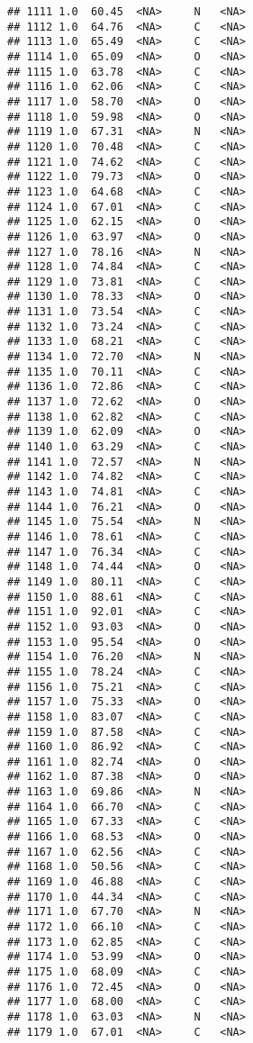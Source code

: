 \documentclass[
]{article}
\begin{document}
\begin{verbatim}
## 1111 1.0  60.45  <NA>     N   <NA>
## 1112 1.0  64.76  <NA>     C   <NA>
## 1113 1.0  65.49  <NA>     C   <NA>
## 1114 1.0  65.09  <NA>     O   <NA>
## 1115 1.0  63.78  <NA>     C   <NA>
## 1116 1.0  62.06  <NA>     C   <NA>
## 1117 1.0  58.70  <NA>     O   <NA>
## 1118 1.0  59.98  <NA>     O   <NA>
## 1119 1.0  67.31  <NA>     N   <NA>
## 1120 1.0  70.48  <NA>     C   <NA>
## 1121 1.0  74.62  <NA>     C   <NA>
## 1122 1.0  79.73  <NA>     O   <NA>
## 1123 1.0  64.68  <NA>     C   <NA>
## 1124 1.0  67.01  <NA>     C   <NA>
## 1125 1.0  62.15  <NA>     O   <NA>
## 1126 1.0  63.97  <NA>     O   <NA>
## 1127 1.0  78.16  <NA>     N   <NA>
## 1128 1.0  74.84  <NA>     C   <NA>
## 1129 1.0  73.81  <NA>     C   <NA>
## 1130 1.0  78.33  <NA>     O   <NA>
## 1131 1.0  73.54  <NA>     C   <NA>
## 1132 1.0  73.24  <NA>     C   <NA>
## 1133 1.0  68.21  <NA>     C   <NA>
## 1134 1.0  72.70  <NA>     N   <NA>
## 1135 1.0  70.11  <NA>     C   <NA>
## 1136 1.0  72.86  <NA>     C   <NA>
## 1137 1.0  72.62  <NA>     O   <NA>
## 1138 1.0  62.82  <NA>     C   <NA>
## 1139 1.0  62.09  <NA>     O   <NA>
## 1140 1.0  63.29  <NA>     C   <NA>
## 1141 1.0  72.57  <NA>     N   <NA>
## 1142 1.0  74.82  <NA>     C   <NA>
## 1143 1.0  74.81  <NA>     C   <NA>
## 1144 1.0  76.21  <NA>     O   <NA>
## 1145 1.0  75.54  <NA>     N   <NA>
## 1146 1.0  78.61  <NA>     C   <NA>
## 1147 1.0  76.34  <NA>     C   <NA>
## 1148 1.0  74.44  <NA>     O   <NA>
## 1149 1.0  80.11  <NA>     C   <NA>
## 1150 1.0  88.61  <NA>     C   <NA>
## 1151 1.0  92.01  <NA>     C   <NA>
## 1152 1.0  93.03  <NA>     O   <NA>
## 1153 1.0  95.54  <NA>     O   <NA>
## 1154 1.0  76.20  <NA>     N   <NA>
## 1155 1.0  78.24  <NA>     C   <NA>
## 1156 1.0  75.21  <NA>     C   <NA>
## 1157 1.0  75.33  <NA>     O   <NA>
## 1158 1.0  83.07  <NA>     C   <NA>
## 1159 1.0  87.58  <NA>     C   <NA>
## 1160 1.0  86.92  <NA>     C   <NA>
## 1161 1.0  82.74  <NA>     O   <NA>
## 1162 1.0  87.38  <NA>     O   <NA>
## 1163 1.0  69.86  <NA>     N   <NA>
## 1164 1.0  66.70  <NA>     C   <NA>
## 1165 1.0  67.33  <NA>     C   <NA>
## 1166 1.0  68.53  <NA>     O   <NA>
## 1167 1.0  62.56  <NA>     C   <NA>
## 1168 1.0  50.56  <NA>     C   <NA>
## 1169 1.0  46.88  <NA>     C   <NA>
## 1170 1.0  44.34  <NA>     C   <NA>
## 1171 1.0  67.70  <NA>     N   <NA>
## 1172 1.0  66.10  <NA>     C   <NA>
## 1173 1.0  62.85  <NA>     C   <NA>
## 1174 1.0  53.99  <NA>     O   <NA>
## 1175 1.0  68.09  <NA>     C   <NA>
## 1176 1.0  72.45  <NA>     O   <NA>
## 1177 1.0  68.00  <NA>     C   <NA>
## 1178 1.0  63.03  <NA>     N   <NA>
## 1179 1.0  67.01  <NA>     C   <NA>

\end{verbatim}
\end{document}
